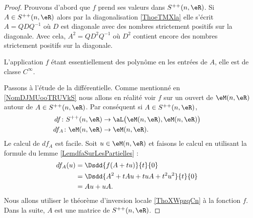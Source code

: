 \begin{proof}
    Prouvons d'abord que \( f\) prend ses valeurs dans \( S^{++}(n,\eR)\). Si \( A\in S^{++}(n,\eR)\) alors par la diagonalisation \ref{ThoeTMXla} elle s'écrit \( A=QDQ^{-1}\) où \( D\) est diagonale avec des nombres strictement positifs sur la diagonale. Avec cela, \( A^2=QD^2Q^{-1}\) où \( D^2\) contient encore des nombres strictement positifs sur la diagonale.

    L'application \( f\) étant essentiellement des polynôme en les entrées de \( A\), elle est de classe \( C^{\infty}\).

    Passons à l'étude de la différentielle. Comme mentionné en \ref{NomDJMUooTRUVkS} nous allons en réalité voir \( f\) sur un ouvert de \( \eM(n,\eR)\) autour de \( A\in S^{++}(n,\eR)\). Par conséquent si \( A\in S^{++}(n,\eR)\),
    \begin{subequations}
        \begin{align}
            df\colon S^{++}(n,\eR)&\to \aL\big( \eM(n,\eR),\eM(n,\eR) \big)\\
            df_A\colon \eM(n,\eR)&\to \eM(n,\eR).
        \end{align}
    \end{subequations}
    Le calcul de \( df_A\) est facile. Soit \( u\in \eM(n,\eR)\) et faisons le calcul en utilisant la formule du lemme \eqref{LemdfaSurLesPartielles} :
    \begin{subequations}
        \begin{align}
            df_A(u)&=\Dsdd{ f(A+tu) }{t}{0}\\
            &=\Dsdd{ A^2+tAu+tuA+t^2u^2 }{t}{0}\\
            &=Au+uA.
        \end{align}
    \end{subequations}
    Nous allons utiliser le théorème d'inversion locale \ref{ThoXWpzqCn} à la fonction \( f\). Dans la suite, \( A\) est une matrice de \( S^{++}(n,\eR)\).


\end{proof}
